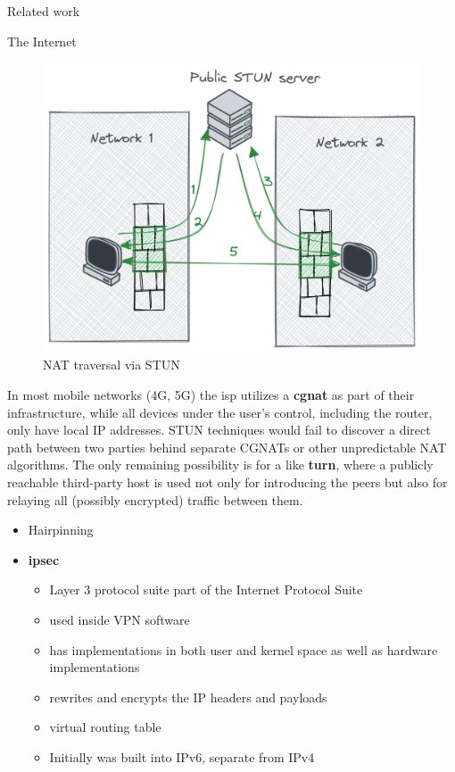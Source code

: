 \begin{frame}[fragile]{Related work}
\begin{block}{The Internet}
\begin{figure}
\centering
\includegraphics[width=\textwidth,height=0.25\textheight]{thesis/../figures/nat-traversal.png}
\caption{NAT traversal via STUN\label{nat-traversal}}
\end{figure}

In most mobile networks (4G, 5G) the \gls{isp} utilizes a
\textbf{\gls{cgnat}} as part of their infrastructure, while all devices
under the user's control, including the router, only have local IP
addresses. STUN techniques would fail to discover a direct path between
two parties behind separate CGNATs or other unpredictable NAT
algorithms. The only remaining possibility is for a like
\textbf{\acrfull{turn}}, where a publicly reachable third-party host is
used not only for introducing the peers but also for relaying all
(possibly encrypted) traffic between them.

\begin{itemize}
\item
  Hairpinning
\item
  \textbf{\acrfull{ipsec}}

  \begin{itemize}
  \tightlist
  \item
    Layer 3 protocol suite part of the Internet Protocol Suite
  \item
    used inside VPN software
  \item
    has implementations in both user and kernel space as well as
    hardware implementations
  \item
    rewrites and encrypts the IP headers and payloads
  \item
    virtual routing table
  \item
    Initially was built into IPv6, separate from IPv4
  \end{itemize}
\end{itemize}
\end{block}


\end{frame}
